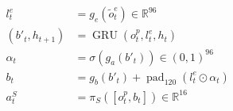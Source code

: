 \documentclass[border=7pt]{standalone}
\begin{document}
\color{ink}
$\displaystyle \begin{aligned}l_t^e&=g_e(\widetilde o_t^e)\in\mathbb R^{96}\\(b'_t,h_{t+1})&=\operatorname{GRU}(o_t^p,l_t^e,h_t)\\\alpha_t&=\sigma(g_a(b'_t))\in(0,1)^{96}\\b_t&=g_b(b'_t)+\operatorname{pad}_{120}(l_t^e\odot\alpha_t)\\a_t^S&=\pi_S([o_t^p,b_t])\in\mathbb R^{16}\end{aligned}$
\end{document}
